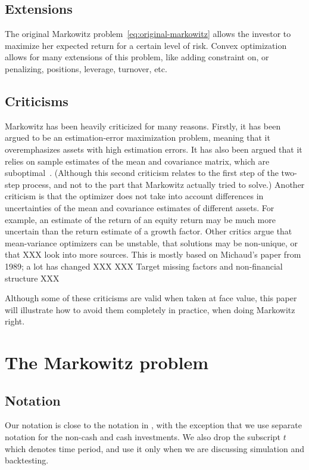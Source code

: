 \documentclass[12pt]{article}
\begin{document}
\subsection{Extensions} 
The original Markowitz problem~\eqref{eq:original-markowitz} allows the investor
to maximize her expected return for a certain level of risk. Convex optimization
allows for many extensions of this problem, like adding constraint on, or penalizing, positions,
leverage, turnover, etc.

\subsection{Criticisms}
Markowitz has been heavily criticized for many reasons. Firstly, it has been
argued to be an estimation-error maximization problem, meaning that it
overemphasizes assets with high estimation errors. It has also been argued that
it relies on sample estimates of the mean and covariance matrix, which are
suboptimal~\cite{michaud1989markowitz_enigma}. (Although this second criticism
relates to the first step of the two-step process, and not to the part that
Markowitz actually tried to solve.) Another criticism is that the optimizer does
not take into account differences in uncertainties of the mean
and covariance estimates of different assets. For example, an estimate of the return of an
equity return may be much more uncertain than the return estimate of a growth
factor. Other critics argue that mean-variance
optimizers can be unstable, that solutions may be non-unique, or that XXX look
into more sources. This is mostly based on Michaud's paper from 1989; a lot has
changed XXX XXX Target missing factors and non-financial structure XXX 

Although some of these criticisms are valid when taken at face value, this paper
will illustrate how to avoid them completely in practice, when doing Markowitz
right. 



\section{The Markowitz problem}

\subsection{Notation}

Our notation is close to the notation in \cite{BoydKahnMultiPeriod},
with the exception that we use separate notation for the non-cash and cash investments.
We also drop the subscript $t$ which denotes time period, and 
use it only when we are discussing simulation and backtesting.
\end{document}
